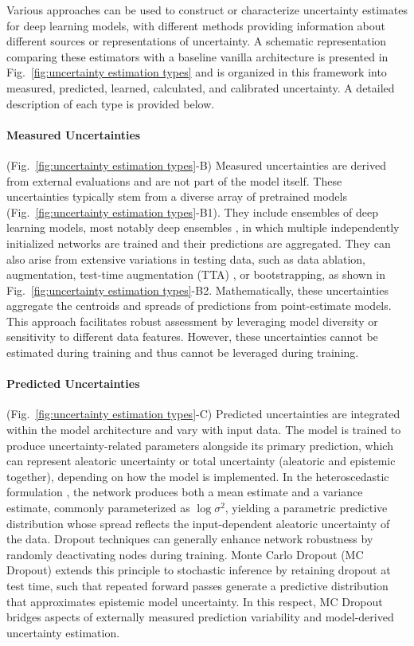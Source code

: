 Various approaches can be used to construct or characterize uncertainty estimates for deep learning models, with different methods providing information about different sources or representations of uncertainty. A schematic representation comparing these estimators with a baseline vanilla architecture is presented in Fig.~\ref{fig:uncertainty estimation types} and is organized in this framework into measured, predicted, learned, calculated, and calibrated uncertainty. A detailed description of each type is provided below.

\paragraph{Measured Uncertainties} (Fig.~\ref{fig:uncertainty estimation types}-B) Measured uncertainties are derived from external evaluations and are not part of the model itself. These uncertainties typically stem from a diverse array of pretrained models (Fig.~\ref{fig:uncertainty estimation types}-B1). They include ensembles of deep learning models, most notably deep ensembles \cite{Lakshminarayanan2017}, in which multiple independently initialized networks are trained and their predictions are aggregated. They can also arise from extensive variations in testing data, such as data ablation, augmentation, test-time augmentation (TTA) \cite{Wang2019}, or bootstrapping, as shown in Fig.~\ref{fig:uncertainty estimation types}-B2. Mathematically, these uncertainties aggregate the centroids and spreads of predictions from point-estimate models. This approach facilitates robust assessment by leveraging model diversity or sensitivity to different data features. However, these uncertainties cannot be estimated during training and thus cannot be leveraged during training.

\paragraph{Predicted Uncertainties} (Fig.~\ref{fig:uncertainty estimation types}-C) Predicted uncertainties are integrated within the model architecture and vary with input data. The model is trained to produce uncertainty-related parameters alongside its primary prediction, which can represent aleatoric uncertainty or total uncertainty (aleatoric and epistemic together), depending on how the model is implemented. In the heteroscedastic formulation \cite{Kendall2017}, the network produces both a mean estimate and a variance estimate, commonly parameterized as $\log \sigma^2$, yielding a parametric predictive distribution whose spread reflects the input-dependent aleatoric uncertainty of the data. Dropout techniques can generally enhance network robustness by randomly deactivating nodes during training. Monte Carlo Dropout (MC Dropout) \cite{Gal2016} extends this principle to stochastic inference by retaining dropout at test time, such that repeated forward passes generate a predictive distribution that approximates epistemic model uncertainty. In this respect, MC Dropout bridges aspects of externally measured prediction variability and model-derived uncertainty estimation.

